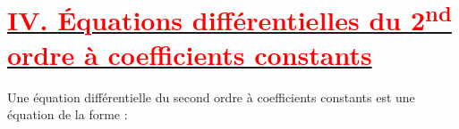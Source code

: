\documentclass[12pt,a4paper]{article}
\begin{document}

\section*{\underline{\textbf{\textcolor{red}{IV. Équations différentielles du 2\textsuperscript{nd} ordre à coefficients constants}}}}

Une équation différentielle du second ordre à coefficients constants est une équation de la forme :
\end{document}

